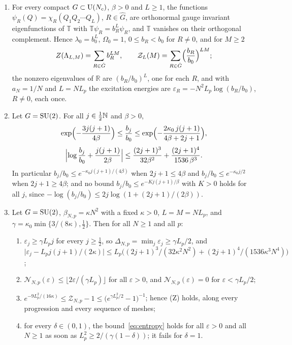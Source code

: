 \begin{proposition}\label{prop:Ztwod}
\leavevmode
\begin{enumerate}[label=\textup{(\roman*)},leftmargin=*]
\item For every compact $G\subset\mathrm{U}(N_c)$, $\beta>0$ and $L\ge1$, the functions
$\psi_R(Q)=\chi_R(Q_1Q_2\cdots Q_L)$, $R\in\hat G$, are orthonormal gauge
invariant eigenfunctions of $\mathbb T$ with $\mathbb T\psi_R=b_R^L\psi_R$,
and $\mathbb T$ vanishes on their orthogonal complement. Hence
$\lambda_0=b_0^L$, $\Omega_0=1$, $0\le b_R<b_0$ for $R\ne0$, and for $M\ge2$
\[
Z(\Lambda_{L,M})=\sum_{R\in\hat G}b_R^{LM},\qquad
\mathcal Z_L(M)=\sum_{R\in\hat G}\Bigl(\frac{b_R}{b_0}\Bigr)^{LM};
\]
the nonzero eigenvalues of $\mathbb R$ are $(b_R/b_0)^L$, one for each $R$,
and with $a_N=1/N$ and $L=NL_p$ the excitation energies are $\varepsilon_R=
-N^2L_p\log(b_R/b_0)$, $R\ne0$, each once.
\item Let $G=\mathrm{SU}(2)$. For all $j\in\frac12\mathbb{N}$ and $\beta>0$,
\[
\exp\Bigl(-\frac{3j(j+1)}{4\beta}\Bigr)\le\frac{b_j}{b_0}\le
\exp\Bigl(-\frac{2\kappa_0\,j(j+1)}{4\beta+2j+1}\Bigr),
\]
\[
\Bigl|\log\frac{b_j}{b_0}+\frac{j(j+1)}{2\beta}\Bigr|\le\frac{(2j+1)^3}{32\beta^2}
+\frac{(2j+1)^4}{1536\,\beta^3}.
\]
In particular $b_j/b_0\le e^{-\kappa_0j(j+1)/(4\beta)}$ when $2j+1\le4\beta$
and $b_j/b_0\le e^{-\kappa_0j/2}$ when $2j+1\ge4\beta$; and no bound
$b_j/b_0\le e^{-Kj(j+1)/\beta}$ with $K>0$ holds for all $j$, since
$-\log(b_j/b_0)\le2j\log(1+(2j+1)/(2\beta))$.
\item Let $G=\mathrm{SU}(2)$, $\beta_{N,p}=\kappa N^2$ with a fixed $\kappa>0$, $L=M=
NL_p$, and $\gamma=\kappa_0\min\{3/(8\kappa),\tfrac12\}$. Then for all $N\ge1$
and all $p$:
\begin{enumerate}[label=\textup{(\alph*)},leftmargin=*]
\item $\varepsilon_j\ge\gamma L_pj$ for every $j\ge\frac12$, so $\Delta_{N,p}=
\min_j\varepsilon_j\ge\gamma L_p/2$, and $\bigl|\varepsilon_j-L_pj(j+1)/
(2\kappa)\bigr|\le L_p\bigl((2j+1)^3/(32\kappa^2N^2)+(2j+1)^4/(1536\kappa^3
N^4)\bigr)$;
\item $\mathcal N_{N,p}(\varepsilon)\le\lfloor2\varepsilon/(\gamma L_p)\rfloor$
for all $\varepsilon>0$, and $\mathcal N_{N,p}(\varepsilon)=0$ for
$\varepsilon<\gamma L_p/2$;
\item $e^{-9L_p^2/(16\kappa)}\le\mathcal Z_{N,p}-1\le\bigl(e^{\gamma L_p^2/2}
-1\bigr)^{-1}$; hence \textup{(Z)} holds, along every progression and every
sequence of meshes;
\item for every $\delta\in(0,1)$, the bound~\eqref{eq:entropy} holds for all
$\varepsilon>0$ and all $N\ge1$ as soon as $L_p^2\ge2/(\gamma(1-\delta))$; it
fails for $\delta=1$.
\end{enumerate}
\end{enumerate}
\end{proposition}


